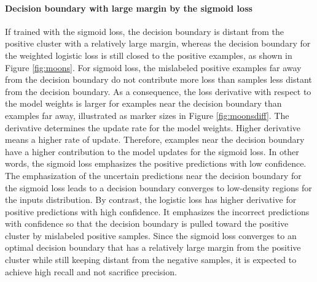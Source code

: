 \paragraph{Decision boundary with large margin by the sigmoid loss}
If trained with the sigmoid loss, the decision boundary is distant from the positive cluster with a relatively large margin, whereas the decision boundary for the weighted logistic loss is still closed to the positive examples, as shown in Figure \ref{fig:moons}.
For sigmoid loss, the mislabeled positive examples far away from the decision boundary do not contribute more loss than samples less distant from the decision boundary.
As a consequence, the loss derivative with respect to the model weights is larger for examples near the decision boundary than examples far away, illustrated as marker sizes in Figure \ref{fig:moonsdiff}.
The derivative determines the update rate for the model weights.
Higher derivative means a higher rate of update.
Therefore, examples near the decision boundary have a higher contribution to the model updates for the sigmoid loss.
In other words, the sigmoid loss emphasizes the positive predictions with low confidence.
The emphasization of the uncertain predictions near the decision boundary for the sigmoid loss leads to a decision boundary converges to low-density regions for the inputs distribution.
By contrast, the logistic loss has higher derivative for positive predictions with high confidence.
It emphasizes the incorrect predictions with confidence so that the decision boundary is pulled toward the positive cluster by mislabeled positive samples.
Since the sigmoid loss converges to an optimal decision boundary that has a relatively large margin from the positive cluster while still keeping distant from the negative samples, it is expected to achieve high recall and not sacrifice precision.



